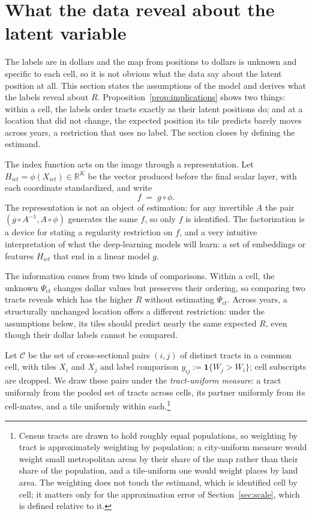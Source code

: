 \documentclass[11pt]{article}
\theoremstyle{remark}
\newcommand{\Cc}{\mathcal{C}}
\begin{document}
\section{What the data reveal about the latent variable}\label{sec:target}

The labels are in dollars and the map from positions to dollars is unknown and specific to each cell,
so it is not obvious what the data say about the latent position at all. This section states the
assumptions of the model and derives what the labels reveal about $R$. Proposition~\ref{prop:implications}
shows two things: within a cell, the labels order tracts exactly as their latent positions do; and at a
location that did not change, the expected position its tile predicts barely moves across years, a
restriction that uses no label. The section closes by defining the estimand.

The index function acts on the image through a representation. Let
$H_{ict} = \phi(X_{ict}) \in \mathbb{R}^{K}$ be the vector produced before the final scalar layer, with
each coordinate standardized, and write
\begin{equation}\label{eq:rep}
    f \;=\; g \circ \phi .
\end{equation}
The representation is not an object of estimation: for any invertible $A$ the pair
$(g\circ A^{-1}, A\circ\phi)$ generates the same $f$, so only $f$ is identified. The factorization is a
device for stating a regularity restriction on $f$, and a very intuitive interpretation of what the deep-learning models will learn: a set of embeddings or features $H_{ict}$ that end in a linear model $g$. 

The information comes from two kinds of comparisons. Within a cell, the unknown $\Psi_{ct}$ changes dollar values but preserves their ordering, so comparing two tracts reveals which has the higher $R$ without estimating $\Psi_{ct}$. Across years, a structurally unchanged location offers a different restriction: under the assumptions below, its tiles should predict nearly the same expected $R$, even though their dollar labels cannot be compared.

Let $\Cc$ be the set of cross-sectional pairs $(i,j)$ of distinct tracts in a common cell, with tiles $X_i$ and $X_j$ and label comparison $y_{ij}:=\mathbf{1}\{W_j>W_i\}$; cell subscripts are dropped. We draw these pairs under the \emph{tract-uniform measure}: a tract uniformly from the pooled set of tracts across cells, its partner uniformly from its cell-mates, and a tile uniformly within each.\footnote{Census tracts are drawn to hold roughly equal populations, so weighting by tract is approximately weighting by population; a city-uniform measure would weight small metropolitan areas by their share of the map rather than their share of the population, and a tile-uniform one would weight places by land area. The weighting does not touch the estimand, which is identified cell by cell; it matters only for the approximation error of Section~\ref{sec:scale}, which is defined relative to it.}
\end{document}
